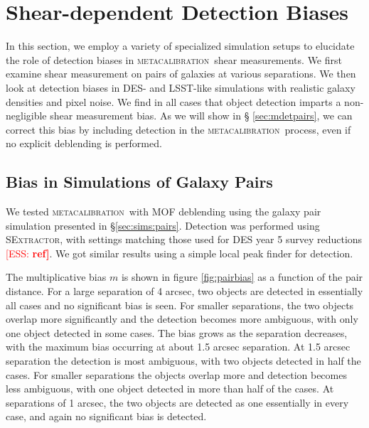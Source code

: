 \documentclass[fleqn,useAMS,usenatbib]{mnras}
\newcommand{\ess}[1]{\textcolor{red}{[ESS: \bf #1]}}
\newcommand{\mcal}{\textsc{metacalibration}}
\newcommand{\sx}{\textsc{SExtractor}}
\begin{document}
\section{Shear-dependent Detection Biases}

In this section, we employ a variety of specialized simulation setups to
elucidate the role of detection biases in \mcal\ shear measurements. We first
examine shear measurement on pairs of galaxies at various separations. We then
look at detection biases in DES- and LSST-like simulations with realistic
galaxy densities and pixel noise. We find in all cases that object detection
imparts a non-negligible shear measurement bias. As we will show in \S
\ref{sec:mdetpairs}, we can correct this bias by including detection in the
\mcal\ process, even if no explicit deblending is performed.

\subsection{Bias in Simulations of Galaxy Pairs}

We tested \mcal\ with MOF deblending using the galaxy pair simulation presented
in \S \ref{sec:sims:pairs}. Detection was performed using \sx, with settings
matching those used for DES year 5 survey reductions \ess{ref}.  We got similar
results using a simple local peak finder for detection.

The multiplicative bias $m$ is shown in figure \ref{fig:pairbias} as a function
of the pair distance. For a large separation of 4 arcsec, two objects are
detected in essentially all cases and no significant bias is seen.  For smaller
separations, the two objects overlap more significantly and the detection
becomes more ambiguous, with only one object detected in some cases.  The bias
grows as the separation decreases, with the maximum bias occurring at about 1.5
arcsec separation. At 1.5 arcsec separation the detection is most ambiguous,
with two objects detected in half the cases. For smaller separations the
objects overlap more and detection becomes less ambiguous, with one object
detected in more than half of the cases. At separations of 1 arcsec, the two
objects are detected as one essentially in every case, and again no significant
bias is detected.
\end{document}
